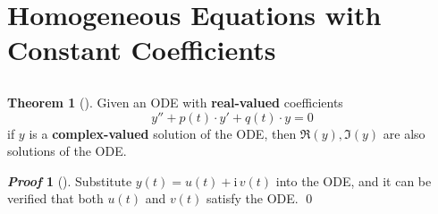 \documentclass[10pt,UTF8]{article}
\newenvironment{theoremBox}
{
  \begin{tcolorbox}[colback=yellow!5!white,colframe=yellow!75!black,parbox=false,before
  upper=\par,before lower=\par]}
  {
\end{tcolorbox}}
\theoremstyle{definition}
\newtheorem{definition inner}{Definition}[section]
\theoremstyle{definition}
\newtheorem{theorem inner}{Theorem}[section]
\newenvironment{theorem}[1][]
{
  \begin{theoremBox}
  \begin{theorem inner}[#1]\hfill\par}
    {
    \end{theorem inner}
\end{theoremBox}}
\theoremstyle{definition}
\newtheorem*{proof inner}{\textit{Proof}}
\renewenvironment{proof}[1][]
{
\begin{proof inner}[#1]\hfill\par}
  {\qed\vphantom{.}
\end{proof inner}}
\theoremstyle{plain}
\newtheorem{tip inner}{Tip}[section]
\theoremstyle{remark}
\newcommand{\iu}{\mathrm{i}}  %
\begin{document}
\section{Homogeneous Equations with Constant Coefficients}

\subsection{}

\begin{theorem}
  {}\label{thm: complex solution to real solutions}
  Given an ODE with \textbf{real-valued} coefficients
  \begin{equation*}
    y'' + p(t)\cdot y' + q(t)\cdot y = 0
  \end{equation*}
  if \(y\) is a \textbf{complex-valued} solution of the ODE\@,
  then \(\Re(y), \Im(y)\) are also solutions of the ODE\@.
\end{theorem}

\begin{proof}
  Substitute \(y(t) = u(t) + \iu \, v(t)\) into the ODE\@,
  and it can be verified that both \(u(t)\) and \(v(t)\)
  satisfy the ODE\@.
\end{proof}
\end{document}
